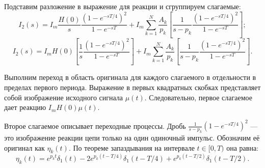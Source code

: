 Подставим разложение в выражение для реакции и сгруппируем слагаемые:
\begin{equation}
    I_{2}(s) = I_m \frac{H(0)}{s} \frac{\left( 1 - e^{-sT/4} \right)^2}{1 - e^{-sT}} + I_m \sum_{k=1}^N \frac{A_k}{p_k} \left[ \frac{1}{s - p_k} \frac{\left( 1 - e^{-sT/4} \right)^2}{1 - e^{-sT}} \right];
\end{equation}
\begin{equation}
    I_{2}(s) = I_m H(0) \left[ \frac{1}{s} \frac{\left( 1 - e^{-sT/4} \right)^2}{1 - e^{-sT}} \right] + I_m \sum_{k=1}^N \frac{A_k}{p_k} \left[ \frac{1}{s - p_k} \frac{\left( 1 - e^{-sT/4} \right)^2}{1 - e^{-sT}} \right].
\end{equation}

Выполним переход в область оригинала для каждого слагаемого в отдельности в пределах первого периода. Выражение в первых квадратных скобках представляет собой изображение исходного сигнала $\mu(t)$. Следовательно, первое слагаемое дает реакцию $I_m H(0) \mu(t)$.



Второе слагаемое описывает переходные процессы. Дробь $\frac{1}{s - p_k} \left( 1 - e^{-sT/4} \right)^2$ --- это изображение реакции цепи только на один одиночный импульс. Обозначим её оригинал как $\eta_k(t)$. По теореме запаздывания на интервале $t \in [0, T)$ она равна:
\begin{equation}
    \eta_k(t) = e^{p_k t}\delta_1(t) - 2e^{p_k(t - T/4)}\delta_1(t - T/4) + e^{p_k(t - T/2)}\delta_1(t - T/2).
\end{equation}

